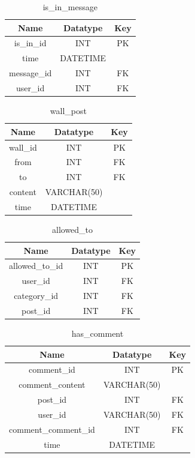 \begin{table}[!ht]
\caption{is\_in\_message}
\centering
\begin{tabular}{c c c}
\hline\hline
Name               & Datatype        & Key \\
\hline
is\_in\_id         & INT             & PK  \\
time               & DATETIME        &     \\
message\_id        & INT             & FK  \\
user\_id           & INT             & FK  \\
\hline
\end{tabular}
\label{table:nonlin}
\end{table}

\begin{table}[!ht]
\caption{wall\_post}
\centering
\begin{tabular}{c c c}
\hline\hline
Name                    & Datatype    & Key \\
\hline
wall\_id                & INT         & PK  \\
from                    & INT         & FK  \\
to                      & INT         & FK  \\
content                 & VARCHAR(50) &     \\
time                    & DATETIME    &     \\
\hline
\end{tabular}
\label{table:nonlin}
\end{table}

\begin{table}[!ht]
\caption{allowed\_to}
\centering
\begin{tabular}{c c c}
\hline\hline
Name                    & Datatype    & Key \\
\hline
allowed\_to\_id         & INT         & PK  \\
user\_id                & INT         & FK  \\
category\_id            & INT         & FK  \\
post\_id                & INT         & FK  \\
\hline
\end{tabular}
\label{table:nonlin}
\end{table}

\begin{table}[!ht]
\caption{has\_comment}
\centering
\begin{tabular}{c c c}
\hline\hline
Name                 & Datatype     & Key \\
\hline
comment\_id          & INT     & PK  \\
comment\_content     & VARCHAR(50)  &     \\
post\_id             & INT     & FK  \\
user\_id             & VARCHAR(50)  & FK  \\
comment\_comment\_id & INT     & FK   \\
time                 & DATETIME     &     \\
\hline
\end{tabular}
\label{table:nonlin}
\end{table}

